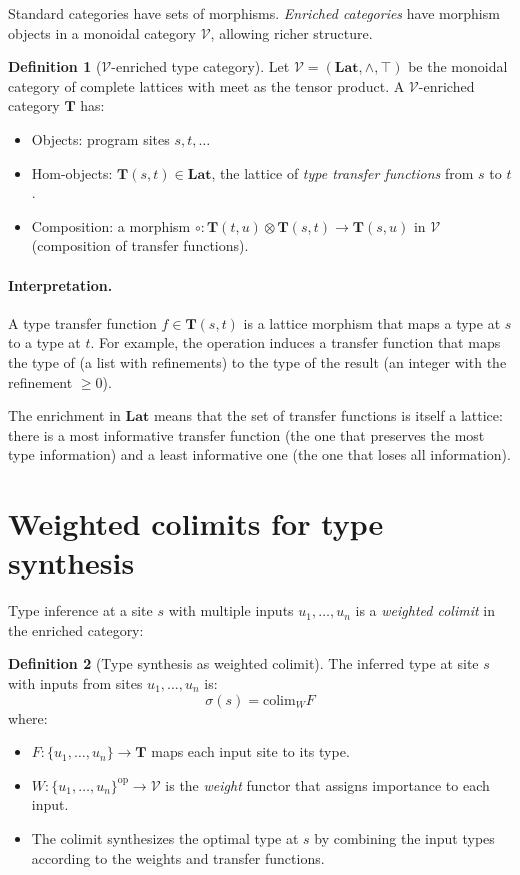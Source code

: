 \documentclass[11pt]{report}
\DeclareRobustCommand{\py}[1]{\texttt{\detokenize{#1}}}
\theoremstyle{definition}
\newtheorem{definition}{Definition}[section]
\theoremstyle{plain}
\begin{document}
Standard categories have sets of morphisms. \emph{Enriched categories} have
morphism objects in a monoidal category $\mathcal{V}$, allowing richer
structure.

\begin{definition}[$\mathcal{V}$-enriched type category]
Let $\mathcal{V} = (\mathbf{Lat}, \wedge, \top)$ be the monoidal category
of complete lattices with meet as the tensor product. A
$\mathcal{V}$-enriched category $\mathbf{T}$ has:
\begin{itemize}[nosep]
  \item Objects: program sites $s, t, \ldots$
  \item Hom-objects: $\mathbf{T}(s, t) \in \mathbf{Lat}$, the lattice of
        \emph{type transfer functions} from $s$ to $t$.
  \item Composition: a morphism
        $\circ : \mathbf{T}(t, u) \otimes \mathbf{T}(s, t) \to
        \mathbf{T}(s, u)$ in $\mathcal{V}$ (composition of transfer
        functions).
\end{itemize}
\end{definition}

\paragraph{Interpretation.}
A type transfer function $f \in \mathbf{T}(s, t)$ is a lattice morphism that
maps a type at $s$ to a type at $t$. For example, the operation
\py{len(xs)} induces a transfer function that maps the type of \py{xs}
(a list with refinements) to the type of the result (an integer with the
refinement $\geq 0$).

The enrichment in $\mathbf{Lat}$ means that the set of transfer functions
is itself a lattice: there is a most informative transfer function (the one
that preserves the most type information) and a least informative one (the
one that loses all information).

\section{Weighted colimits for type synthesis}

Type inference at a site $s$ with multiple inputs $u_1, \ldots, u_n$ is a
\emph{weighted colimit} in the enriched category:

\begin{definition}[Type synthesis as weighted colimit]
The inferred type at site $s$ with inputs from sites $u_1, \ldots, u_n$ is:
\[
  \sigma(s) = \mathrm{colim}_{W} F
\]
where:
\begin{itemize}[nosep]
  \item $F : \{u_1, \ldots, u_n\} \to \mathbf{T}$ maps each input site to
        its type.
  \item $W : \{u_1, \ldots, u_n\}^{\mathrm{op}} \to \mathcal{V}$ is the
        \emph{weight} functor that assigns importance to each input.
  \item The colimit synthesizes the optimal type at $s$ by combining the
        input types according to the weights and transfer functions.
\end{itemize}
\end{definition}
\end{document}
